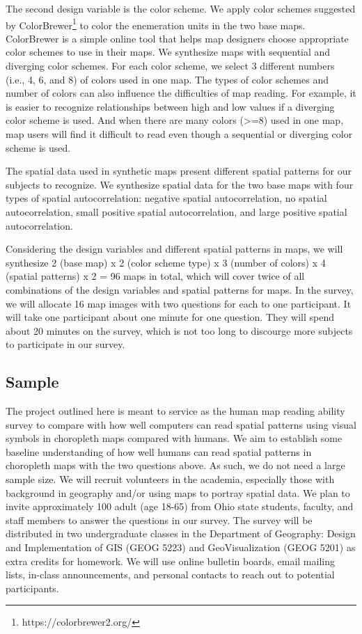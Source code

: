 The second design variable is the color scheme. We apply color schemes suggested by ColorBrewer\footnote{https://colorbrewer2.org/} to color the enemeration units in the two base maps. ColorBrewer is a simple online tool that helps map designers choose appropriate color schemes to use in their maps. We synthesize maps with sequential and diverging color schemes. For each color scheme, we  select 3 different numbers (i.e., 4, 6, and 8) of colors used in one map. The types of color schemes and number of colors can also influence the difficulties of map reading. For example, it is easier to recognize relationships between high and low values if a diverging color scheme is used. And when there are many colors (>=8) used in one map, map users will find it difficult to read even though a sequential or diverging color scheme is used.

The spatial data used in synthetic maps present different spatial patterns for our subjects to recognize. We synthesize spatial data for the two base maps with four types of spatial autocorrelation: negative spatial autocorrelation, no spatial autocorrelation, small positive spatial autocorrelation, and large positive spatial autocorrelation.

Considering the design variables and different spatial patterns in maps, we will synthesize 2 (base map) x 2 (color scheme type) x 3 (number of colors) x 4 (spatial patterns) x 2 = 96 maps in total, which will cover twice of all combinations of the design variables and spatial patterns for maps. In the survey, we will allocate 16 map images with two questions for each to one participant. It will take one participant about one minute for one question. They will spend about 20 minutes on the survey, which is not too long to discourge more subjects to participate in our survey. 

\subsection{Sample}

The project outlined here is meant to service as the human map reading ability survey to compare with how well computers can read spatial patterns using visual symbols in choropleth maps compared with humans. We aim to establish some baseline understanding of how well humans can read spatial patterns in choropleth maps with the two questions above. As such, we do not need a large sample size. We will recruit volunteers in the academia, especially those with background in geography and/or using maps to portray spatial data. We plan to invite approximately 100 adult (age 18-65) from Ohio state students, faculty, and staff members to answer the questions in our survey. The survey will be distributed in two undergraduate classes in the Department of Geography: Design and Implementation of GIS (GEOG 5223) and GeoVisualization (GEOG 5201) as extra credits for homework. We will use online bulletin boards, email mailing lists, in-class announcements, and personal contacts to reach out to potential participants.

